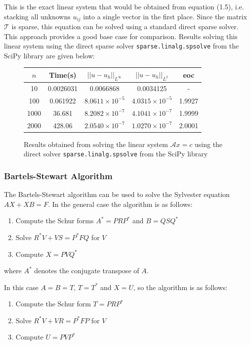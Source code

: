 \documentclass{article}
\numberwithin{equation}{section}
\begin{document}
This is the exact linear system that would be obtained from equation (1.5), i.e. stacking all unknowns $u_{ij}$ into a single vector in the first place. Since the matrix $\mathcal{T}$ is sparse, this equation can be solved using a standard direct sparse solver. This approach provides a good base case for comparison. Results solving this linear system using the direct sparse solver \texttt{sparse.linalg.spsolve} from the SciPy library are given below:

\begin{figure}
\begin{table}[H]
\centering
\begin{tabular}{|c|c|c|c|c|}
\hline
$n$ & Time(s) & $|| u - u_h ||_{L^{\infty}}$ &$|| u - u_h ||_{L^{2}}$ & eoc \\
\hline
10 & 0.0026031 & 0.0066868 & 0.0034125 & - \\
100 & 0.061922 & $8.0611 \times 10^{-5}$ & $4.0315 \times 10^{-5}$ & 1.9927 \\
1000 & 36.681 & $8.2082 \times 10^{-7}$ & $4.1041 \times 10^{-7}$ & 1.9999  \\
2000 & 428.06 & $2.0540 \times 10^{-7}$ & $1.0270 \times 10^{-7}$ & 2.0001 \\
\hline
\end{tabular}
\end{table}
\caption{Results obtained from solving the linear system $\mathcal{A} x = c$ using the direct solver  \texttt{sparse.linalg.spsolve} from the SciPy library}
\end{figure}

\subsubsection{Bartels-Stewart Algorithm}
The Bartels-Stewart algorithm \cite{Bartels} can be used to solve the Sylvester equation $AX + XB = F$. In the general case the algorithm is as follows:
\begin{enumerate}
\item Compute the Schur forms $A^* = PRP^*$ and $B=QSQ^*$
\item Solve $R^*V + VS = P^*FQ$ for $V$
\item Compute $X=PVQ^*$
\end{enumerate}
where $A^*$ denotes the conjugate transpose of $A$.

In this case $A=B=T$, $T=T^*$ and $X=U$, so the algorithm is as follows:
\begin{enumerate}
\item Compute the Schur form $T=PRP^*$
\item Solve $R^*V + VR = P^*FP$ for $V$
\item Compute $U=PVP^*$
\end{enumerate}
\end{document}
